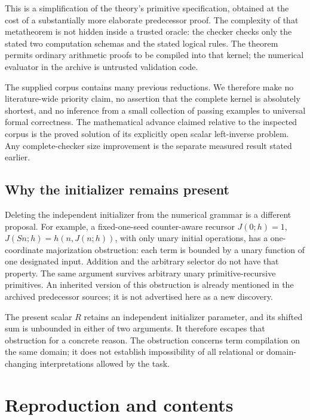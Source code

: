 \documentclass[11pt,letterpaper]{article}
\theoremstyle{definition}\newtheorem{definition}[theorem]{Definition}
\theoremstyle{remark}\newtheorem{remark}[theorem]{Remark}
\begin{document}
This is a simplification of the theory's primitive specification, obtained
at the cost of a substantially more elaborate predecessor proof. The
complexity of that metatheorem is not hidden inside a trusted oracle:
the checker checks only the stated two computation schemas and the stated
logical rules. The theorem permits ordinary arithmetic proofs to be
compiled into that kernel; the numerical evaluator in the archive is
untrusted validation code.

The supplied corpus contains many previous reductions. We therefore
make no literature-wide priority claim, no assertion that the complete
kernel is absolutely shortest, and no inference from a small collection
of passing examples to universal formal correctness. The mathematical
advance claimed relative to the inspected corpus is the proved solution
of its explicitly open scalar left-inverse problem. Any complete-checker
size improvement is the separate measured result stated earlier.

\subsection{Why the initializer remains present}

Deleting the independent initializer from the numerical grammar is a
different proposal. For example, a fixed-one-seed counter-aware recursor
$J(0;h)=1$, $J(Sn;h)=h(n,J(n;h))$, with only unary initial operations,
has a one-coordinate majorization obstruction: each term is bounded by
a unary function of one designated input. Addition and the arbitrary
selector do not have that property. The same argument survives arbitrary
unary primitive-recursive primitives. An inherited version of this
obstruction is already mentioned in the archived predecessor sources;
it is not advertised here as a new discovery.

The present scalar $R$ retains an independent initializer parameter,
and its shifted sum is unbounded in either of two arguments. It therefore
escapes that obstruction for a concrete reason. The obstruction concerns
term compilation on the same domain; it does not establish impossibility
of all relational or domain-changing interpretations allowed by the task.

\section{Reproduction and contents}
\end{document}

